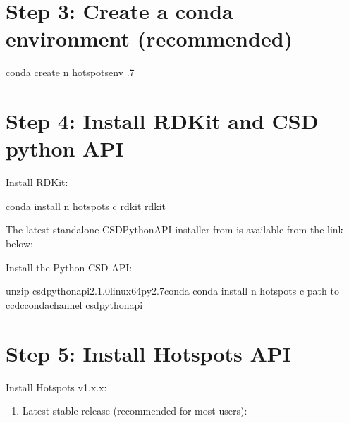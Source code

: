 \documentclass[letterpaper,10pt,english]{sphinxmanual}
\begin{document}
\section{Step 3: Create a conda environment (recommended)}
\label{\detokenize{tutorial:step-3-create-a-conda-environment-recommended}}
\begin{sphinxVerbatim}[commandchars=\\\{\}]
conda create \PYGZhy{}n hotspots\PYGZus{}env .7
\end{sphinxVerbatim}


\section{Step 4: Install RDKit and CSD python API}
\label{\detokenize{tutorial:step-4-install-rdkit-and-csd-python-api}}
Install RDKit:

\begin{sphinxVerbatim}[commandchars=\\\{\}]
conda install \PYGZhy{}n hotspots \PYGZhy{}c rdkit rdkit
\end{sphinxVerbatim}

The latest standalone CSD\sphinxhyphen{}Python\sphinxhyphen{}API installer from is available from the link below:


Install the Python CSD API:

\begin{sphinxVerbatim}[commandchars=\\\{\}]
unzip csd\PYGZhy{}python\PYGZhy{}api\PYGZhy{}2.1.0\PYGZhy{}linux\PYGZhy{}64\PYGZhy{}py2.7\PYGZhy{}conda
conda install \PYGZhy{}n hotspots \PYGZhy{}c \PYGZlt{}path to ccdc\PYGZus{}conda\PYGZus{}channel\PYGZgt{} csd\PYGZhy{}python\PYGZhy{}api
\end{sphinxVerbatim}


\section{Step 5: Install Hotspots API}
\label{\detokenize{tutorial:step-5-install-hotspots-api}}
Install Hotspots v1.x.x:
\begin{enumerate}
%
\item {} 
Latest stable release (recommended for most users):

\end{enumerate}
\end{document}
